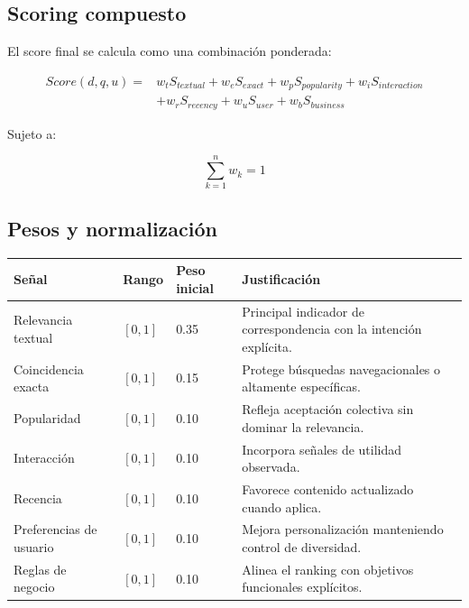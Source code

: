 \documentclass[12pt,a4paper]{article}
\begin{document}
\subsection{Scoring compuesto}

El score final se calcula como una combinación ponderada:

\[
\begin{aligned}
Score(d,q,u) ={}&
w_t S_{textual} +
w_e S_{exact} +
w_p S_{popularity} +
w_i S_{interaction} \\
&+
w_r S_{recency} +
w_u S_{user} +
w_b S_{business}
\end{aligned}
\]

Sujeto a:

\[
\sum_{k=1}^{n} w_k = 1
\]

\subsection{Pesos y normalización}

\begin{longtable}{p{4cm}p{3cm}p{3cm}p{4cm}}
\toprule
\textbf{Señal} & \textbf{Rango} & \textbf{Peso inicial} & \textbf{Justificación} \\
\midrule
\endhead

Relevancia textual & $[0,1]$ & 0.35 & Principal indicador de correspondencia con la intención explícita. \\

Coincidencia exacta & $[0,1]$ & 0.15 & Protege búsquedas navegacionales o altamente específicas. \\

Popularidad & $[0,1]$ & 0.10 & Refleja aceptación colectiva sin dominar la relevancia. \\

Interacción & $[0,1]$ & 0.10 & Incorpora señales de utilidad observada. \\

Recencia & $[0,1]$ & 0.10 & Favorece contenido actualizado cuando aplica. \\

Preferencias de usuario & $[0,1]$ & 0.10 & Mejora personalización manteniendo control de diversidad. \\

Reglas de negocio & $[0,1]$ & 0.10 & Alinea el ranking con objetivos funcionales explícitos. \\

\bottomrule
\end{longtable}
\end{document}

